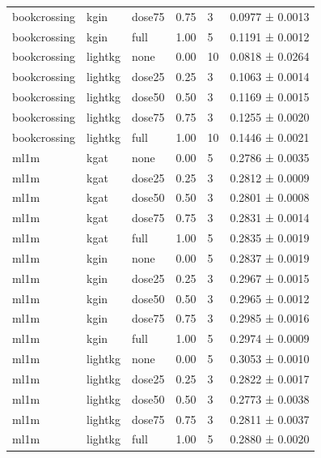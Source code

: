 \begin{table}[t]
\begin{tabular}{llllll}
bookcrossing & kgin & dose75 & 0.75 & 3 & 0.0977 ± 0.0013 \\
bookcrossing & kgin & full & 1.00 & 5 & 0.1191 ± 0.0012 \\
bookcrossing & lightkg & none & 0.00 & 10 & 0.0818 ± 0.0264 \\
bookcrossing & lightkg & dose25 & 0.25 & 3 & 0.1063 ± 0.0014 \\
bookcrossing & lightkg & dose50 & 0.50 & 3 & 0.1169 ± 0.0015 \\
bookcrossing & lightkg & dose75 & 0.75 & 3 & 0.1255 ± 0.0020 \\
bookcrossing & lightkg & full & 1.00 & 10 & 0.1446 ± 0.0021 \\
ml1m & kgat & none & 0.00 & 5 & 0.2786 ± 0.0035 \\
ml1m & kgat & dose25 & 0.25 & 3 & 0.2812 ± 0.0009 \\
ml1m & kgat & dose50 & 0.50 & 3 & 0.2801 ± 0.0008 \\
ml1m & kgat & dose75 & 0.75 & 3 & 0.2831 ± 0.0014 \\
ml1m & kgat & full & 1.00 & 5 & 0.2835 ± 0.0019 \\
ml1m & kgin & none & 0.00 & 5 & 0.2837 ± 0.0019 \\
ml1m & kgin & dose25 & 0.25 & 3 & 0.2967 ± 0.0015 \\
ml1m & kgin & dose50 & 0.50 & 3 & 0.2965 ± 0.0012 \\
ml1m & kgin & dose75 & 0.75 & 3 & 0.2985 ± 0.0016 \\
ml1m & kgin & full & 1.00 & 5 & 0.2974 ± 0.0009 \\
ml1m & lightkg & none & 0.00 & 5 & 0.3053 ± 0.0010 \\
ml1m & lightkg & dose25 & 0.25 & 3 & 0.2822 ± 0.0017 \\
ml1m & lightkg & dose50 & 0.50 & 3 & 0.2773 ± 0.0038 \\
ml1m & lightkg & dose75 & 0.75 & 3 & 0.2811 ± 0.0037 \\
ml1m & lightkg & full & 1.00 & 5 & 0.2880 ± 0.0020 \\
\hline
\end{tabular}
\end{table}
